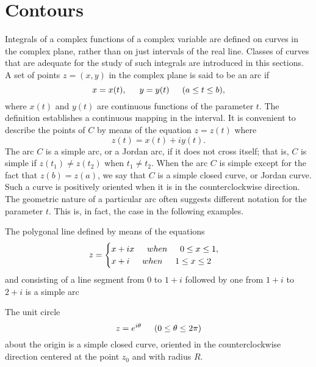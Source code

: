 \section{Contours}
Integrals of a complex functions of a complex variable are defined on curves in the complex plane, rather than on just intervals of the real line. Classes of curves that are adequate for the study of such integrals are introduced in this sections. \\ \indent 
A set  of points $ z = (x,y) $ in the complex plane is said to be an arc if 
\[ x = x(t), \indent y = y(t) \indent (a \leq t \leq b), \] where $ x(t) $ and $ y(t) $ are continuous functions of the parameter $ t$. The definition establishes a continuous mapping in the interval. It is convenient to describe the points of $ C $ by means of the equation
$ z = z(t) $ where \[ z(t) = x(t) + iy(t). \] The arc $ C $ is a simple arc, or a Jordan arc, if it does not cross itself; that is, $ C $ is simple if $ z(t_1) \neq z(t_2) $ when $ t_1 \neq t_2 $. When the arc $ C $ is simple except for the fact that $ z(b) = z(a) $, we say that $ C $ is a simple closed curve, or Jordan curve. Such a curve is positively oriented when it is in the counterclockwise direction. \\ \indent 
The geometric nature of a particular arc often suggests different notation for the parameter $ t $. This is, in fact, the case in the following examples. 
\begin{example}
	The polygonal line defined by means of the equations 
	\begin{gather}
		z = 
		\begin{cases}
			x + ix \indent when \indent 0 \leq x \leq 1, \\
			x + i \indent when \indent 1 \leq x \leq 2
		\end{cases}
	\end{gather}
	and consisting of a line segment from $ 0 $ to $ 1 + i $ followed by one from $ 1 + i $ to $ 2 + i $ is a simple arc 
\end{example}
\begin{example}
	The unit circle \[ z = e^{i \theta} \indent (0 \leq \theta \leq 2 \pi) \]
	about the origin is a simple closed curve, oriented in the counterclockwise direction centered at the point $ z_0 $ and with radius $ R $. 
\end{example}
